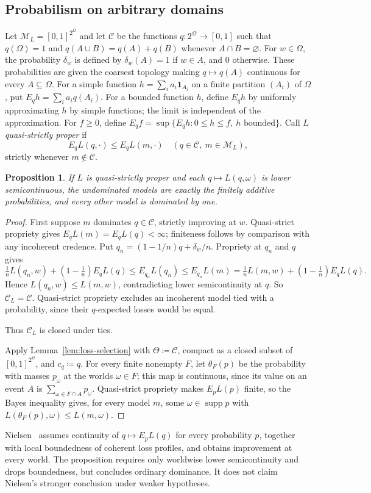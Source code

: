 \documentclass[11pt]{article}
\newtheorem{proposition}[theorem]{Proposition}
\theoremstyle{definition}
\theoremstyle{remark}
\newcommand{\M}{\mathcal M}
\newcommand{\C}{\mathcal C}
\newcommand{\supp}{\operatorname{supp}}
\begin{document}
\subsection{Probabilism on arbitrary domains}
Let $\M_L=[0,1]^{2^\Omega}$ and let $\C$ be the functions $q:2^\Omega\to[0,1]$ such that $q(\Omega)=1$ and $q(A\cup B)=q(A)+q(B)$ whenever $A\cap B=\varnothing$. For $w\in\Omega$, the probability $\delta_w$ is defined by $\delta_w(A)=1$ if $w\in A$, and $0$ otherwise. These probabilities are given the coarsest topology making $q\mapsto q(A)$ continuous for every $A\subseteq\Omega$. For a simple function $h=\sum_i a_i\mathbf1_{A_i}$ on a finite partition $(A_i)$ of $\Omega$, put $E_qh=\sum_i a_iq(A_i)$. For a bounded function $h$, define $E_qh$ by uniformly approximating $h$ by simple functions; the limit is independent of the approximation. For $f\ge0$, define $E_qf=\sup\{E_qh:0\le h\le f,\ h\text{ bounded}\}$. Call $L$ \emph{quasi-strictly proper} if
\[
E_qL(q,\cdot)\le E_qL(m,\cdot)\quad(q\in\C,\ m\in\M_L),
\]
strictly whenever $m\notin\C$.
\begin{proposition}\label{prop:short-infinite}
If $L$ is quasi-strictly proper and each $q\mapsto L(q,\omega)$ is lower semicontinuous, the undominated models are exactly the finitely additive probabilities, and every other model is dominated by one.
\end{proposition}
\begin{proof}
First suppose $m$ dominates $q\in\C$, strictly improving at $w$. Quasi-strict propriety gives $E_qL(m)=E_qL(q)<\infty$; finiteness follows by comparison with any incoherent credence. Put $q_n=(1-1/n)q+\delta_w/n$. Propriety at $q_n$ and $q$ gives
\[
\tfrac1nL(q_n,w)+(1-\tfrac1n)E_qL(q)
\le E_{q_n}L(q_n)\le E_{q_n}L(m)
=\tfrac1nL(m,w)+(1-\tfrac1n)E_qL(q).
\]
Hence $L(q_n,w)\le L(m,w)$, contradicting lower semicontinuity at $q$. So $\C_L=\C$. Quasi-strict propriety excludes an incoherent model tied with a probability, since their $q$-expected losses would be equal. {\color{red}Thus $\C_L$ is closed under ties.

Apply Lemma~\ref{lem:loss-selection} with $\Theta\coloneqq\C$, compact as a closed subset of $[0,1]^{2^\Omega}$, and $c_q\coloneqq q$. For every finite nonempty $F$, let $\theta_F(p)$ be the probability with masses $p_\omega$ at the worlds $\omega\in F$; this map is continuous, since its value on an event $A$ is $\sum_{\omega\in F\cap A}p_\omega$. Quasi-strict propriety makes $E_pL(p)$ finite, so the Bayes inequality gives, for every model $m$, some $\omega\in\supp p$ with $L(\theta_F(p),\omega)\le L(m,\omega)$.}
\end{proof}
Nielsen~\cite{Nielsen2023} assumes continuity of $q\mapsto E_pL(q)$ for every probability $p$, together with local boundedness of coherent loss profiles, and obtains improvement at every world. The proposition requires only worldwise lower semicontinuity and drops boundedness, but concludes ordinary dominance. It does not claim Nielsen's stronger conclusion under weaker hypotheses.
\end{document}
